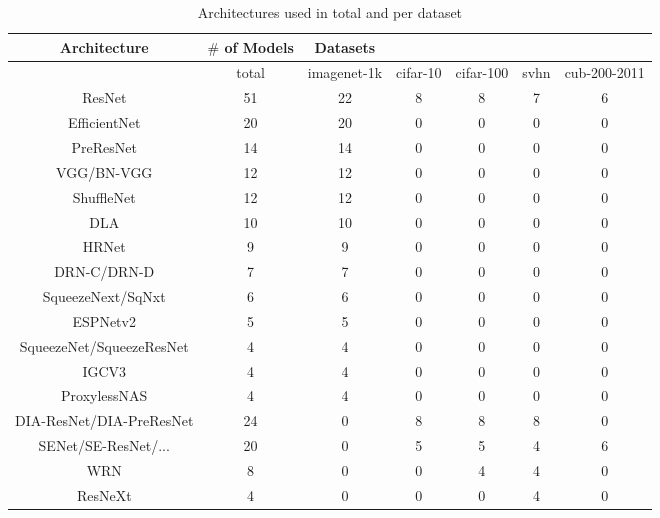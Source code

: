 \begin{table}[t]
\small
\begin{center}
\begin{tabular}{|c|c|c|c|c|c|c|}
\hline
Architecture & $\#$ of Models & Datasets & & & & \\
\hline
  & total &imagenet-1k & cifar-10 & cifar-100 & svhn & cub-200-2011 \\
\hline
ResNet & 51 &22 & 8 & 8 & 7 & 6 \\
EfficientNet & 20 &20 & 0 & 0 & 0 & 0 \\
PreResNet & 14 &14 & 0 & 0 & 0 & 0 \\
VGG/BN-VGG & 12 &12 & 0 & 0 & 0 & 0 \\
ShuffleNet & 12 &12 & 0 & 0 & 0 & 0 \\
DLA & 10 &10 & 0 & 0 & 0 & 0 \\
HRNet & 9 &9 & 0 & 0 & 0 & 0 \\
DRN-C/DRN-D & 7 &7 & 0 & 0 & 0 & 0 \\
SqueezeNext/SqNxt & 6 &6 & 0 & 0 & 0 & 0 \\
ESPNetv2 & 5 &5 & 0 & 0 & 0 & 0 \\
SqueezeNet/SqueezeResNet & 4 &4 & 0 & 0 & 0 & 0 \\
IGCV3 & 4 &4 & 0 & 0 & 0 & 0 \\
ProxylessNAS & 4 &4 & 0 & 0 & 0 & 0 \\
DIA-ResNet/DIA-PreResNet & 24 &0 & 8 & 8 & 8 & 0 \\
SENet/SE-ResNet/... & 20 &0 & 5 & 5 & 4 & 6 \\
WRN & 8 &0 & 0 & 4 & 4 & 0 \\
ResNeXt & 4 &0 & 0 & 0 & 4 & 0 \\
\hline
\end{tabular}
\end{center}
\caption{Architectures used in total and per dataset }
\label{table:architectures}
\end{table}




